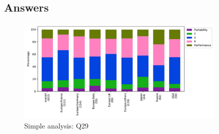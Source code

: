 
\subsection{Answers}


\begin{figure}[htb]
\begin{center}
\includegraphics[width=10cm]{../pdfs/Q29.pdf}
\caption{Simple analysis: Q29}
\label{fig:Q29}
\end{center}
\end{figure}
